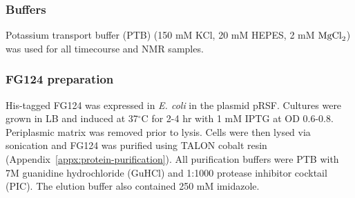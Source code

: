 \subsubsection{Buffers} Potassium transport buffer (PTB) (150 mM KCl, 20 mM HEPES, 2 mM $\mathrm{MgCl}_2$) was used for all timecourse and NMR samples.

\subsubsection{FG124 preparation} His-tagged FG124 was expressed in \textit{E. coli} in the plasmid pRSF.  Cultures were grown in LB and  induced at 37$^\circ$C for 2-4 hr with 1 mM IPTG at OD 0.6-0.8.  Periplasmic matrix was removed prior to lysis.  Cells were then lysed via sonication and FG124 was purified using TALON cobalt resin (Appendix~\ref{appx:protein-purification}).  All purification buffers were PTB with 7M guanidine hydrochloride (GuHCl) and 1:1000 protease inhibitor cocktail (PIC).  The elution buffer also contained 250 mM imidazole.

